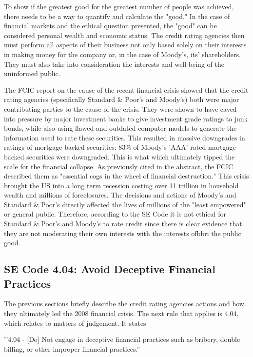 \documentclass[11pt]{article}
\begin{document}
\begin{multicols}{2}
To show if the greatest good for the greatest number of people was achieved, there needs to be a way to quantify and calculate the "good." In the case of financial markets and the ethical question presented, the "good" can be considered personal wealth and economic status.  The credit rating agencies then must perform all aspects of their business not only based solely on their interests in making money for the company or, in the case of Moody's, its' shareholders.  They must also take into consideration the interests and well being of the uninformed public.

The FCIC report on the cause of the recent financial crisis showed that the credit rating agencies (specifically Standard \& Poor's and Moody's) both were major contributing parties to the cause of the crisis. \cite{govtReport, huffCreditCause}  They were shown to have caved into pressure by major investment banks to give investment grade ratings to junk bonds, while also using flawed and outdated computer models to generate the information used to rate these securities.  This resulted in massive downgrades in ratings of mortgage-backed securities: 83\% of Moody's 'AAA' rated mortgage-backed securities were downgraded. \cite[p.~xxv]{govtReport} This is what which ultimately tipped the scale for the financial collapse.  As previously cited in the abstract, the FCIC described them as "essential cogs in the wheel of financial destruction."  This crisis brought the US into a long term recession costing over 11 trillion in household wealth and millions of foreclosures.  The decisions and actions of Moody's and Standard \& Poor's directly affected the lives of millions of the "least empowered" or general public. Therefore, according to the SE Code it is not ethical for Standard \& Poor's and Moody's to rate credit since there is clear evidence that they are not moderating their own interests with the interests ofbbri the public good. 


\subsection{SE Code 4.04: Avoid Deceptive Financial Practices}

The previous sections briefly describe the credit rating agencies actions and how they ultimately led the 2008 financial crisis.  The next rule that applies is 4.04, which relates to matters of judgement.  It states


{\addtolength{\leftskip}{6mm}
{\textbf''4.04 - [Do] Not engage in deceptive financial practices such as bribery, double billing, or other improper financial practices.''
}}



\end{multicols}
\end{document}

